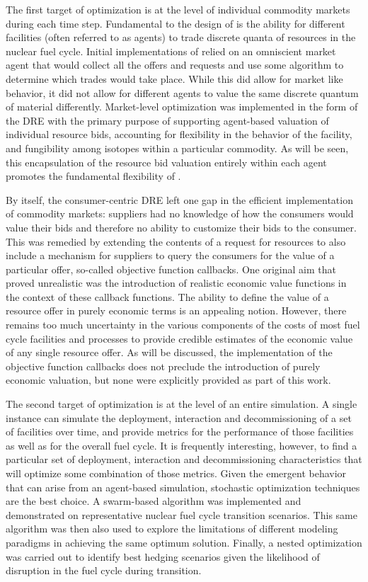 The first target of optimization is at the level of individual commodity
markets during each time step.  Fundamental to the design of \Cyclus is the
ability for different facilities (often referred to as agents) to trade
discrete quanta of resources in the nuclear fuel cycle.  Initial
implementations of \Cyclus relied on an omniscient market agent that would
collect all the offers and requests and use some algorithm to determine which
trades would take place.  While this did allow for market like behavior, it
did not allow for different agents to value the same discrete quantum of
material differently.  Market-level optimization was implemented in the form
of the \gls{DRE} with the primary purpose of supporting agent-based valuation
of individual resource bids, accounting for flexibility in the behavior of the
facility, and fungibility among isotopes within a particular commodity.  As
will be seen, this encapsulation of the resource bid valuation entirely within
each agent promotes the fundamental flexibility of \Cyclus.

By itself, the consumer-centric \gls{DRE} left one gap in the efficient
implementation of commodity markets: suppliers had no knowledge of how the
consumers would value their bids and therefore no ability to customize their
bids to the consumer.  This was remedied by extending the contents of a
request for resources to also include a mechanism for suppliers to query the
consumers for the value of a particular offer, so-called objective function
callbacks.  One original aim that proved unrealistic was the introduction of
realistic economic value functions in the context of these callback functions.
The ability to define the value of a resource offer in purely economic terms
is an appealing notion.  However, there remains too much uncertainty in the
various components of the costs of most fuel cycle facilities and processes to
provide credible estimates of the economic value of any single resource offer.
As will be discussed, the implementation of the objective function callbacks
does not preclude the introduction of purely economic valuation, but none were
explicitly provided as part of this work.

The second target of optimization is at the level of an entire simulation.  A
single \Cyclus instance can simulate the deployment, interaction and
decommissioning of a set of facilities over time, and provide metrics for the
performance of those facilities as well as for the overall fuel cycle.  It is
frequently interesting, however, to find a particular set of deployment,
interaction and decommissioning characteristics that will optimize some
combination of those metrics.  Given the emergent behavior that can arise from
an agent-based simulation, stochastic optimization techniques are the best
choice.  A swarm-based algorithm was implemented and demonstrated on
representative nuclear fuel cycle transition scenarios.  This same algorithm
was then also used to explore the limitations of different modeling paradigms
in achieving the same optimum solution.  Finally, a nested
optimization was carried out to identify best hedging scenarios given the
likelihood of disruption in the fuel cycle during transition.


